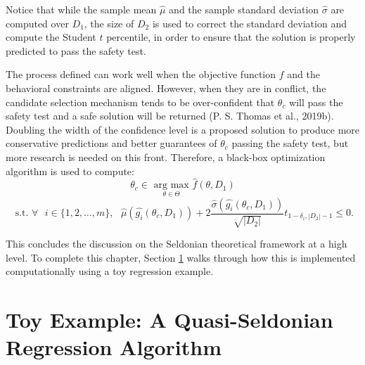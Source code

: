 \documentclass[12pt, twoside]{amherstthesis}
\begin{document}
Notice that while the sample mean \(\hat{\mu}\) and the sample standard deviation \(\hat{\sigma}\) are computed over \(D_1\), the size of \(D_2\) is used to correct the standard deviation and compute the Student \(t\) percentile, in order to ensure that the solution is properly predicted to pass the safety test.

The process defined can work well when the objective function \(f\) and the behavioral constraints are aligned. However, when they are in conflict, the candidate selection mechanism tends to be over-confident that \(\theta_c\) will pass the safety test and a safe solution will be returned (P. S. Thomas et al., 2019b). Doubling the width of the confidence level is a proposed solution to produce more conservative predictions and better guarantees of \(\theta_c\) passing the safety test, but more research is needed on this front. Therefore, a black-box optimization algorithm is used to compute:
\begin{equation}
\label{ch2eq14}
\theta_c \in \underset{\theta \in \Theta}{\text{ arg max }} \hat{f}(\theta, D_1)
\end{equation}
\[\text{ s.t. } \forall \text{ } i \in \{1,2,\ldots,m\}, \text{  } \hat{\mu}(\hat{g_i}(\theta_c, D_1)) + 2\frac{\hat{\sigma}(\hat{g_i}(\theta_c, D_1))}{\sqrt{|D_2|}}t_{1-\delta_i, |D_2|-1} \leq 0.\]

\hfill\break

This concludes the discussion on the Seldonian theoretical framework at a high level. To complete this chapter, Section \ref{toy} walks through how this is implemented computationally using a toy regression example.

\hypertarget{toy}{%
\section{Toy Example: A Quasi-Seldonian Regression Algorithm}\label{toy}}
\end{document}
